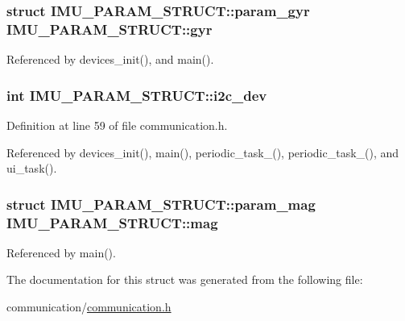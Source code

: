 \hypertarget{structIMU__PARAM__STRUCT_a5a4557868f1af679a1098808397b02ec}{
\subsubsection[{gyr}]{\setlength{\rightskip}{0pt plus 5cm}struct {\bf I\-M\-U\-\_\-\-P\-A\-R\-A\-M\-\_\-\-S\-T\-R\-U\-C\-T\-::param\-\_\-gyr} I\-M\-U\-\_\-\-P\-A\-R\-A\-M\-\_\-\-S\-T\-R\-U\-C\-T\-::gyr}}\label{structIMU__PARAM__STRUCT_a5a4557868f1af679a1098808397b02ec}


Referenced by devices\-\_\-init(), and main().

\hypertarget{structIMU__PARAM__STRUCT_a8a870f383fc9ba0b682fdc9b8c0d2734}{
\subsubsection[{i2c\-\_\-dev}]{\setlength{\rightskip}{0pt plus 5cm}int I\-M\-U\-\_\-\-P\-A\-R\-A\-M\-\_\-\-S\-T\-R\-U\-C\-T\-::i2c\-\_\-dev}}\label{structIMU__PARAM__STRUCT_a8a870f383fc9ba0b682fdc9b8c0d2734}


Definition at line 59 of file communication.\-h.



Referenced by devices\-\_\-init(), main(), periodic\-\_\-task\-\_(), periodic\-\_\-task\-\_(), and ui\-\_\-task().

\hypertarget{structIMU__PARAM__STRUCT_a26b277dcaf05f3842995df888225f6f4}{
\subsubsection[{mag}]{\setlength{\rightskip}{0pt plus 5cm}struct {\bf I\-M\-U\-\_\-\-P\-A\-R\-A\-M\-\_\-\-S\-T\-R\-U\-C\-T\-::param\-\_\-mag} I\-M\-U\-\_\-\-P\-A\-R\-A\-M\-\_\-\-S\-T\-R\-U\-C\-T\-::mag}}\label{structIMU__PARAM__STRUCT_a26b277dcaf05f3842995df888225f6f4}


Referenced by main().



The documentation for this struct was generated from the following file\-:\begin{DoxyCompactItemize}
\item 
communication/\hyperlink{communication_2communication_8h}{communication.\-h}\end{DoxyCompactItemize}
